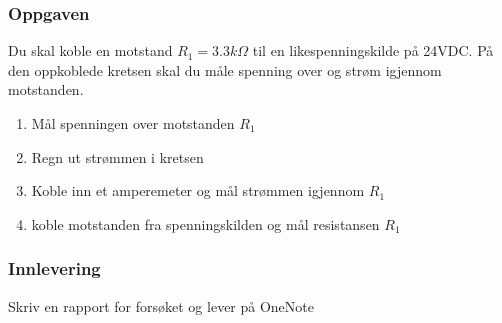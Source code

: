 \subsubsection*{Oppgaven}

Du skal koble en motstand $R_{1}=3.3k\Omega$ til en likespenningskilde
på 24VDC. På den oppkoblede kretsen skal du måle spenning over og strøm igjennom motstanden. 

\begin{enumerate}
\item Mål spenningen over motstanden $R_{1}$
\item Regn ut strømmen i kretsen
\item Koble inn et amperemeter og mål strømmen igjennom $R_{1}$ 
\item koble motstanden fra spenningskilden og mål resistansen $R_{1}$
\end{enumerate}

\subsubsection*{Innlevering}

Skriv en rapport for forsøket og lever på OneNote
\vskip 5pt 



